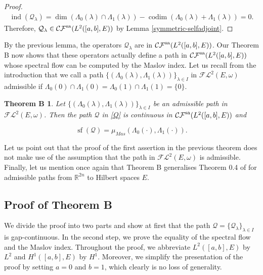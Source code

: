 \documentclass[a4paper,10pt]{article}
\newtheorem*{theoremB}{Theorem B}
\DeclareMathOperator{\ind}{ind}
\DeclareMathOperator{\sfl}{sf}
\DeclareMathOperator{\codim}{codim}
\begin{document}
\begin{proof}
\begin{align*}
\ind(\mathcal{Q}_\lambda)=\dim(\Lambda_0(\lambda)\cap\Lambda_1(\lambda))-\codim(\Lambda_0(\lambda)+\Lambda_1(\lambda))=0.
\end{align*}
Therefore, $\mathcal{Q}_\lambda\in\mathcal{CF}^\textup{sa}(L^2([a,b],E))$ by Lemma \ref{symmetric-selfadjoint}.
\end{proof}
\noindent
By the previous lemma, the operators $\mathcal{Q}_\lambda$ are in $\mathcal{CF}^\textup{sa}(L^2([a,b],E))$. Our Theorem B now shows that these operators actually define a path in $\mathcal{CF}^\textup{sa}(L^2([a,b],E))$ whose spectral flow can be computed by the Maslov index. Let us recall from the introduction that we call a path $\{(\Lambda_0(\lambda),\Lambda_1(\lambda))\}_{\lambda\in I}$ in $\mathcal{FL}^2(E,\omega)$ admissible if $\Lambda_0(0)\cap\Lambda_1(0)=\Lambda_0(1)\cap\Lambda_1(1)=\{0\}$. 


\begin{theoremB}\label{main}
Let $\{(\Lambda_0(\lambda),\Lambda_1(\lambda))\}_{\lambda\in I}$ be an admissible path in $\mathcal{FL}^2(E,\omega)$. Then the path $\mathcal{Q}$ in \eqref{Q} is continuous in $\mathcal{CF}^\textup{sa}(L^2([a,b],E))$ and

\[\sfl(\mathcal{Q})=\mu_{Mas}(\Lambda_0(\cdot),\Lambda_1(\cdot)).\]    
\end{theoremB}
\noindent
Let us point out that the proof of the first assertion in the previous theorem does not make use of the assumption that the path in $\mathcal{FL}^2(E,\omega)$ is admissible. Finally, let us mention once again that Theorem B generalises Theorem 0.4 of \cite{Cappell} for admissible paths from $\mathbb{R}^{2n}$ to Hilbert spaces $E$.



\subsection{Proof of Theorem B}
We divide the proof into two parts and show at first that the path $\mathcal{Q}=\{\mathcal{Q}_\lambda\}_{\lambda\in I}$ is gap-continuous. In the second step, we prove the equality of the spectral flow and the Maslov index. Throughout the proof, we abbreviate $L^2([a,b],E)$ by $L^2$ and $H^1([a,b],E)$ by $H^1$. Moreover, we simplify the presentation of the proof by setting $a=0$ and $b=1$, which clearly is no loss of generality.
\end{document}
